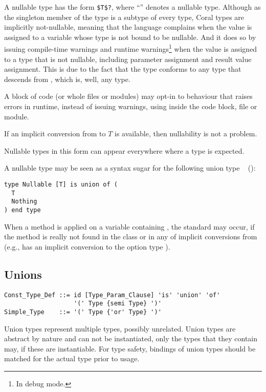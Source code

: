 A nullable type has the form \lstinline!$T$?!, where ``'' denotes a nullable type. Although  as the singleton member of the  type is a subtype of every type, Coral types are implicitly not-nullable, meaning that the language complains when the  value is assigned to a variable whose type is not bound to be nullable. And it does so by issuing compile-time warnings and runtime warnings\footnote{In debug mode.} when the  value is assigned to a type that is not nullable, including parameter assignment and result value assignment. This is due to the fact that the type  conforms to any type that descends from , which is, well, any type. 

A block of code (or whole files or modules) may opt-in to behaviour that raises errors in runtime, instead of issuing warnings, using  inside the code block, file or module. 

If an implicit conversion from  to $T$ is available, then nullability is not a problem. 

Nullable types in this form can appear everywhere where a type is expected. 

A nullable type may be seen as a syntax sugar for the following union type ~ ():
\begin{lstlisting}
type Nullable [T] is union of (
  T
  Nothing
) end type
\end{lstlisting}

When a method is applied on a variable containing , the standard  may occur, if the method is really not found in the class  or in any of implicit conversions from  (e.g.,  has an implicit conversion to the option type ). 





\subsection{Unions}
\label{sec:unions}

\syntax\begin{lstlisting}
Const_Type_Def ::= id [Type_Param_Clause] 'is' 'union' 'of'
                   '(' Type {semi Type} ')'
Simple_Type    ::= '(' Type {'or' Type} ')'
\end{lstlisting}

Union types represent multiple types, possibly unrelated. Union types are abstract by nature and can not be instantiated, only the types that they contain may, if these are instantiable. For type safety, bindings of union types should be matched for the actual type prior to usage. 

